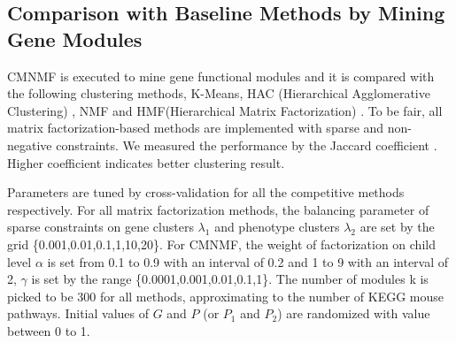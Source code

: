\documentclass{bmcart}
\begin{document}
\subsection*{Comparison with Baseline Methods by Mining Gene Modules}
CMNMF is executed to mine gene functional modules and it is compared with the following clustering methods, K-Means, HAC (Hierarchical Agglomerative Clustering) \cite{HAC}, NMF and HMF(Hierarchical Matrix Factorization) \cite{HMF}. To be fair, all matrix factorization-based methods are implemented with sparse and non-negative constraints. We measured the performance by the Jaccard coefficient \cite{cluster_survey}. Higher coefficient indicates better clustering result.

Parameters are tuned by cross-validation for all the competitive methods respectively. For all matrix factorization methods, the balancing parameter of sparse constraints on gene clusters $\lambda_1$ and phenotype clusters $\lambda_2$ are set by the grid \{0.001,0.01,0.1,1,10,20\}. For CMNMF, the weight of factorization on child level $\alpha$ is set from 0.1 to 0.9 with an interval of 0.2 and 1 to 9 with an interval of 2, $\gamma$ is set by the range \{0.0001,0.001,0.01,0.1,1\}. The number of modules k is picked to be 300 for all methods, approximating to the number of KEGG mouse pathways. Initial values of $G$ and $P$ (or $P_1$ and $P_2$) are randomized with value between 0 to 1.
\end{document}
